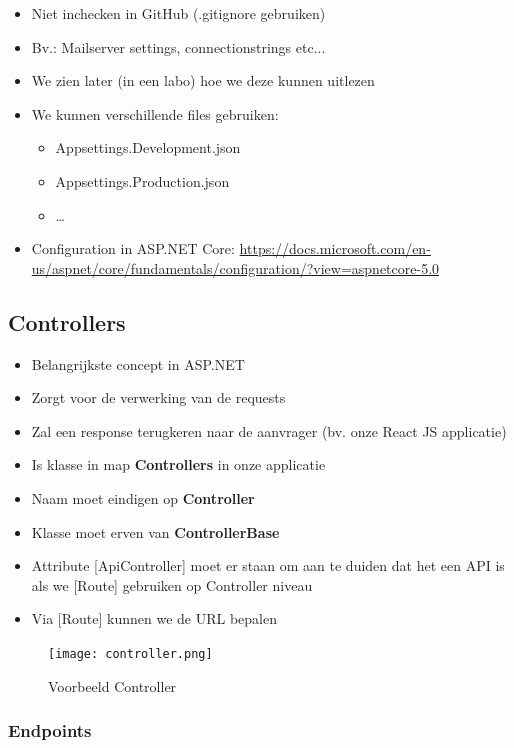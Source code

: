 \documentclass{article}
\begin{document}
\begin{itemize}
    \item Niet inchecken in GitHub (.gitignore gebruiken)
    \item Bv.: Mailserver settings, connectionstrings etc...
    \item We zien later (in een labo) hoe we deze kunnen uitlezen
    \item We kunnen verschillende files gebruiken:
    \begin{itemize}
        \item Appsettings.Development.json
        \item Appsettings.Production.json
        \item \dots
    \end{itemize}
    \item Configuration in ASP.NET Core: \url{https://docs.microsoft.com/en-us/aspnet/core/fundamentals/configuration/?view=aspnetcore-5.0}
\end{itemize}

\subsection{Controllers}

\begin{itemize}
    \item Belangrijkste concept in ASP.NET
    \item Zorgt voor de verwerking van de requests
    \item Zal een response terugkeren naar de aanvrager (bv. onze React JS applicatie)
    \item Is klasse in map \textbf{Controllers} in onze applicatie
    \item Naam moet eindigen op \textbf{Controller}
    \item Klasse moet erven van \textbf{ControllerBase}
    \item Attribute [ApiController] moet er staan om aan te duiden dat het een API is als we [Route] gebruiken op Controller niveau
    \item Via [Route] kunnen we de URL bepalen
\end{itemize}

\begin{figure}[H]
    \centering
    \texttt{[image: controller.png]}
    \caption{Voorbeeld Controller}
\end{figure}


\subsubsection{Endpoints}
\end{document}
